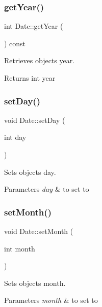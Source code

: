 \subsubsection{\texorpdfstring{get\+Year()}{getYear()}}
{\footnotesize\ttfamily int Date\+::get\+Year (\begin{DoxyParamCaption}{ }\end{DoxyParamCaption}) const}



Retrieves object\textquotesingle{}s year. 

\begin{DoxyReturn}{Returns}
int year 
\end{DoxyReturn}
\mbox{\label{group___date_ga2f97b9d1ac5ef0ef6b6cab3335c5303d}} 
\subsubsection{\texorpdfstring{set\+Day()}{setDay()}}
{\footnotesize\ttfamily void Date\+::set\+Day (\begin{DoxyParamCaption}\item[{int}]{day }\end{DoxyParamCaption})}



Sets object\textquotesingle{}s day. 


\begin{DoxyParams}{Parameters}
{\em day} & to set to \\
\hline
\end{DoxyParams}
\mbox{\label{group___date_ga23aa56014dd581d691607df5d4474f64}} 
\subsubsection{\texorpdfstring{set\+Month()}{setMonth()}}
{\footnotesize\ttfamily void Date\+::set\+Month (\begin{DoxyParamCaption}\item[{int}]{month }\end{DoxyParamCaption})}



Sets object\textquotesingle{}s month. 


\begin{DoxyParams}{Parameters}
{\em month} & to set to \\
\hline
\end{DoxyParams}
\mbox{\label{group___date_ga895c4ae9868e43577cf59d9c679d7a71}} 
